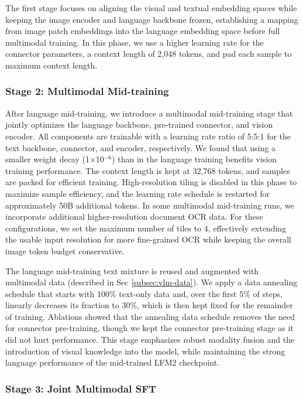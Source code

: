 \documentclass{article}
\begin{document}
The first stage focuses on aligning the visual and textual embedding spaces while keeping the image encoder and language backbone frozen, establishing a mapping from image patch embeddings into the language embedding space before full multimodal training. In this phase, we use a higher learning rate for the connector parameters, a context length of 2,048 tokens, and pad each sample to maximum context length. 

\subsubsection{Stage 2: Multimodal Mid-training}

After language mid-training, we introduce a multimodal mid-training stage that jointly optimizes the language backbone, pre-trained connector, and vision encoder. All components are trainable with a learning rate ratio of 5:5:1 for the text backbone, connector, and encoder, respectively. We found that using a smaller weight decay (1×10$^{-6}$) than in the language training benefits vision training performance. The context length is kept at 32{,}768 tokens, and samples are packed for efficient training. High-resolution tiling is disabled in this phase to maximize sample efficiency, and the learning rate schedule is restarted for approximately 50B additional tokens. In some multimodal mid-training runs, we incorporate additional higher-resolution document OCR data. For these configurations, we set the maximum number of tiles to 4, effectively extending the usable input resolution for more fine-grained OCR while keeping the overall image token budget conservative.

The language mid-training text mixture is reused and augmented with multimodal data (described in Sec \ref{subsec:vlm-data}). We apply a data annealing schedule that starts with 100\% text-only data and, over the first 5\% of steps, linearly decreases its fraction to 30\%, which is then kept fixed for the remainder of training. Ablations showed that the annealing data schedule removes the need for connector pre-training, though we kept the connector pre-training stage as it did not hurt performance. This stage emphasizes robust modality fusion and the introduction of visual knowledge into the model, while maintaining the strong language performance of the mid-trained LFM2 checkpoint.

\subsubsection{Stage 3: Joint Multimodal SFT}
\end{document}
